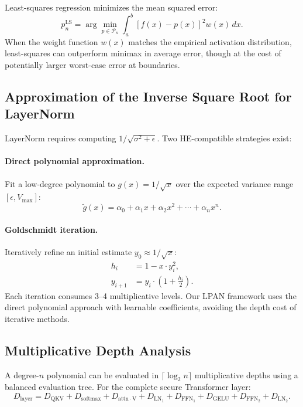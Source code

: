 Least-squares regression minimizes the mean squared error:
\begin{equation}
    p_n^{\text{LS}} = \arg\min_{p \in \mathcal{P}_n} \int_{a}^{b} \left[f(x) - p(x)\right]^2 w(x)\, dx.
    \label{eq:least_squares}
\end{equation}
When the weight function $w(x)$ matches the empirical activation distribution, least-squares can outperform minimax in average error, though at the cost of potentially larger worst-case error at boundaries.

\subsection{Approximation of the Inverse Square Root for LayerNorm}

LayerNorm requires computing $1/\sqrt{\sigma^2 + \epsilon}$. Two HE-compatible strategies exist:

\paragraph{Direct polynomial approximation.} Fit a low-degree polynomial to $g(x) = 1/\sqrt{x}$ over the expected variance range $[\epsilon, V_{\max}]$:
\begin{equation}
    \widetilde{g}(x) = \alpha_0 + \alpha_1 x + \alpha_2 x^2 + \cdots + \alpha_n x^n.
    \label{eq:invsqrt_poly}
\end{equation}

\paragraph{Goldschmidt iteration.} Iteratively refine an initial estimate $y_0 \approx 1/\sqrt{x}$:
\begin{align}
    h_i &= 1 - x \cdot y_i^2, \label{eq:goldschmidt_h} \\
    y_{i+1} &= y_i \cdot \left(1 + \frac{h_i}{2}\right). \label{eq:goldschmidt_y}
\end{align}
Each iteration consumes 3--4 multiplicative levels. Our LPAN framework uses the direct polynomial approach with learnable coefficients, avoiding the depth cost of iterative methods.

\subsection{Multiplicative Depth Analysis}
\label{sec:depth_analysis}

A degree-$n$ polynomial can be evaluated in $\lceil \log_2 n \rceil$ multiplicative depths using a balanced evaluation tree. For the complete secure Transformer layer:
\begin{equation}
    D_{\text{layer}} = D_{\mathrm{QKV}} + D_{\mathrm{softmax}} + D_{\mathrm{attn \cdot V}} + D_{\mathrm{LN}_1} + D_{\mathrm{FFN}_1} + D_{\mathrm{GELU}} + D_{\mathrm{FFN}_2} + D_{\mathrm{LN}_2}.
    \label{eq:layer_depth}
\end{equation}


